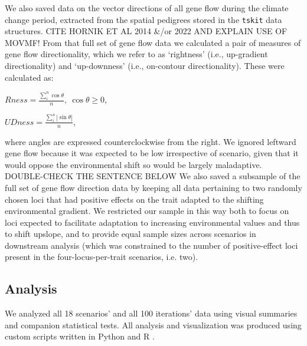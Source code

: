 \documentclass[9pt,twocolumn,twoside,lineno]{pnas-new}
\begin{document}
{We also saved data on the vector directions of all gene flow during the 
climate change period, extracted from the spatial pedigrees stored in the
\texttt{tskit} \cite{kelleher} data structures.
CITE HORNIK  ET AL 2014 &/or 2022 AND EXPLAIN USE OF MOVMF!
From that full set of gene flow data we calculated a pair of measures
of gene flow directionality,  which we refer to as ‘rightness’ (i.e., up-gradient 
directionality) and ‘up-downness’ (i.e., on-contour directionality). These were 
calculated as:

$Rness = \frac{\sum\limits_{i}^{n}\cos\theta}{n},\ \cos\theta\geq0$,

$UDness = \frac{\sum\limits_{i}^{n}|\sin\theta|}{n}$,

where angles are expressed counterclockwise from the right.
We ignored leftward gene flow because it was expected to be low irrespective 
of scenario, given that it would oppose the environmental shift so would be largely maladaptive.
DOUBLE-CHECK THE SENTENCE BELOW
We also saved a subsample of the full set of gene flow 
direction data by keeping all data pertaining to two randomly chosen loci that had 
positive effects on the trait adapted to the shifting environmental gradient. We 
restricted our sample in this way both to focus on loci expected to facilitate 
adaptation to increasing environmental values and thus to shift upslope, and to 
provide equal sample sizes across scenarios in downstream analysis (which was 
constrained to the number of positive-effect loci present in the four-locus-per-trait 
scenarios, i.e. two). 

\subsection*{Analysis}

We analyzed all 18 scenarios' and all 100 iterations' data
using visual summaries and companion statistical tests.
All analysis and visualization was produced using custom scripts written in 
Python and R \cite{r_core_team}.

}
\end{document}
